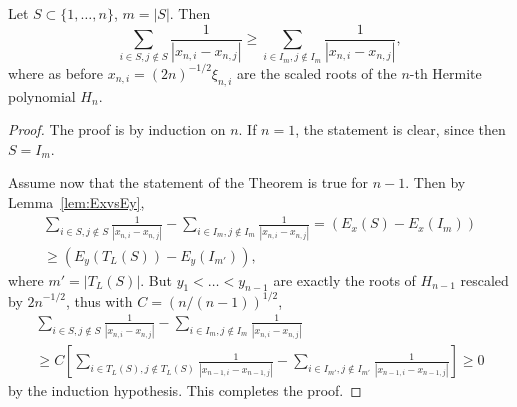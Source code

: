 \begin{theorem} \label{thrm:HermiteIntervalOptimal}
Let $S\subset\{1,\dots,n\}$, $m=|S|$. Then $$\sum_{i\in S,j\notin S} \frac{1}{|x_{n,i}-x_{n,j}|}
\geq \sum_{i\in I_m,j\notin I_m} \frac{1}{|x_{n,i}-x_{n,j}|},$$ where as before $x_{n,i} = (2n)^{-1/2}\xi_{n,i}$ are the scaled roots of the $n$-th Hermite polynomial $H_n$.
\end{theorem}

\begin{proof}
    The proof is by induction on $n$. If $n=1$, the statement is clear, since then $S=I_m$. 
    
    Assume now that the statement of the Theorem is true for $n-1$. Then by Lemma~\ref{lem:ExvsEy}, 
    \begin{multline*}
    \sum_{i\in S,j\notin S} \frac{1}{|x_{n,i}-x_{n,j}|} -\sum_{i\in I_m,j\notin I_m} \frac{1}{|x_{n,i}-x_{n,j}|}  =   
    \left(E_x(S)-E_x(I_m)\right) \\ \geq  \left(E_y(T_L(S))-E_y(I_{m'})\right),
    \end{multline*} where $m'=|T_L(S)|$. But $y_1<\dots <y_{n-1}$ are exactly the roots of $H_{n-1}$ rescaled by ${2n}^{-1/2}$, thus with $C = (n/(n-1))^{1/2}$, 
    \begin{multline*} \sum_{i\in S,j\notin S} \frac{1}{|x_{n,i}-x_{n,j}|} -\sum_{i\in I_m,j\notin I_m} \frac{1}{|x_{n,i}-x_{n,j}|} \\ 
    \geq C\left[\sum_{i\in T_L(S),j\notin T_L(S)} \frac{1}{|x_{n-1,i}-x_{n-1,j}|} -\sum_{i\in I_{m'},j\notin I_{m'}} \frac{1}{|x_{n-1,i}-x_{n-1,j}|}\right] \geq 0
    \end{multline*}
    by the induction hypothesis. This completes the proof.
\end{proof}



